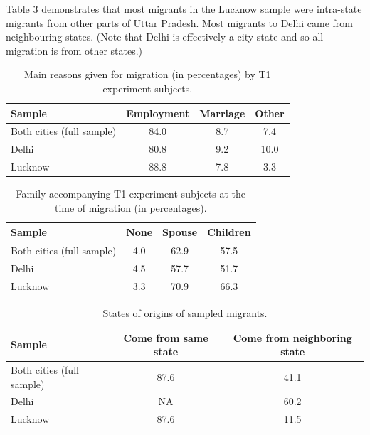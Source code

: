 \documentclass[
  11.5pt,
]{article}
\begin{document}
Table \ref{tab:state_origins} demonstrates that most migrants in the
Lucknow sample were intra-state migrants from other parts of Uttar
Pradesh. Most migrants to Delhi came from neighbouring states. (Note
that Delhi is effectively a city-state and so all migration is from
other states.)

\vspace{2em}

\begin{table}[!h]

\caption{\label{tab:unnamed-chunk-48}\label{tab:reason_for_migration}Main reasons given for migration (in percentages) by T1 experiment subjects.}
\centering
\begin{tabular}[t]{lccc}
\toprule
Sample & Employment & Marriage & Other\\
\midrule
Both cities (full sample) & 84.0 & 8.7 & 7.4\\
Delhi & 80.8 & 9.2 & 10.0\\
Lucknow & 88.8 & 7.8 & 3.3\\
\bottomrule
\end{tabular}
\end{table}

\begin{table}[!h]

\caption{\label{tab:unnamed-chunk-49}\label{tab:migrating_with_family}Family accompanying T1 experiment subjects at the time of migration (in percentages).}
\centering
\begin{tabular}[t]{lccc}
\toprule
Sample & None & Spouse & Children\\
\midrule
Both cities (full sample) & 4.0 & 62.9 & 57.5\\
Delhi & 4.5 & 57.7 & 51.7\\
Lucknow & 3.3 & 70.9 & 66.3\\
\bottomrule
\end{tabular}
\end{table}

\begin{table}[!h]

\caption{\label{tab:unnamed-chunk-50}\label{tab:state_origins}States of origins of sampled migrants.}
\centering
\begin{tabular}[t]{lcc}
\toprule
Sample & Come from same state & Come from neighboring state\\
\midrule
Both cities (full sample) & 87.6 & 41.1\\
Delhi & NA & 60.2\\
Lucknow & 87.6 & 11.5\\
\bottomrule
\end{tabular}
\end{table}
\end{document}
